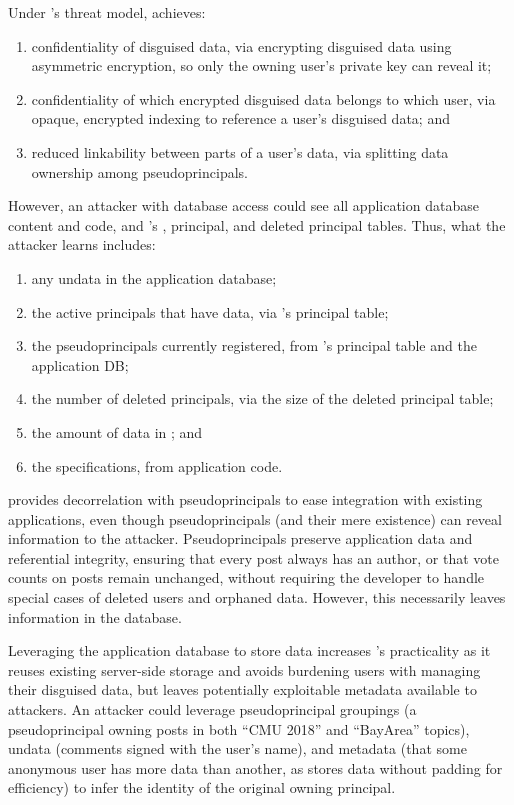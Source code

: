 %
Under \sys's threat model, \sys achieves:
\begin{enumerate}[nosep]
    \item confidentiality of disguised data, via encrypting disguised data using asymmetric encryption, so only the owning user’s private key can reveal it;
    \item confidentiality of which encrypted disguised data belongs to which
        user, via opaque, encrypted indexing to reference a user’s disguised data; and
    \item reduced linkability between parts of a user's data, via splitting data ownership among pseudoprincipals.
\end{enumerate}
%
However, an attacker with database access could see all application database
content and code, and \sys's \xx, principal, and deleted principal tables.
%
Thus, what the attacker learns includes:
\begin{enumerate}[nosep]
  \item any un\xxed data in the application database;
  \item the active principals that have \xxed data, via \sys's principal
      table;
  \item the pseudoprincipals currently registered, from \sys's
    principal table and the application DB;
  \item the number of deleted principals, via the size of the deleted
    principal table;
  \item the amount of \xxed data in \sys; and
  \item the \xx specifications, from application code.
\end{enumerate}

%
\sys provides decorrelation with pseudoprincipals to ease integration with
existing applications, even though pseudoprincipals (and their mere existence) can
reveal information to the attacker.
%
Pseudoprincipals preserve application data and referential integrity, ensuring that
\eg every post always has an author, or that vote counts on posts remain unchanged,
without requiring the developer to handle special cases of deleted users and
orphaned data.
%
However, this necessarily leaves information in the database.
%

Leveraging the application database to store \xxed data increases \sys's
practicality as it reuses existing server-side storage and avoids burdening
users with managing their disguised data, but leaves potentially
exploitable metadata available to attackers.
%
An attacker could leverage pseudoprincipal groupings (\eg a pseudoprincipal
owning posts in both ``CMU 2018'' and ``BayArea'' topics), un\xxed data
(\eg comments signed with the user's name), and \sys metadata (\eg that some
anonymous user has more \xxed data than another, as \sys stores \xxed data without
padding for efficiency) to infer the identity of the original owning principal.

